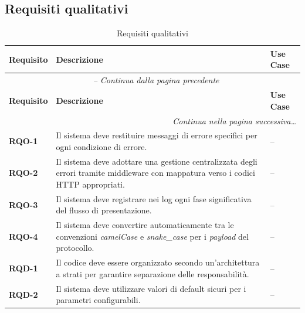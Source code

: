 \subsection{Requisiti qualitativi}
\begin{longtable}{p{1.8cm} p{8.4cm} p{2.2cm}}
\caption{Requisiti qualitativi} \label{tab:requisiti_qualitativi} \\
\toprule
\textbf{Requisito} & \textbf{Descrizione} & \textbf{Use Case} \\
\midrule
\endfirsthead

\multicolumn{3}{c}{\textit{\tablename\ \thetable{} -- Continua dalla pagina precedente}} \\
\midrule
\textbf{Requisito} & \textbf{Descrizione} & \textbf{Use Case} \\
\midrule
\endhead

\midrule
\multicolumn{3}{r}{\textit{Continua nella pagina successiva\dots}} \\
\endfoot

\bottomrule
\endlastfoot

\textbf{RQO-1} & Il sistema deve restituire messaggi di errore specifici per ogni condizione di errore. & -- \\
\hline
\textbf{RQO-2} & Il sistema deve adottare una gestione centralizzata degli errori tramite middleware con mappatura verso i codici HTTP appropriati. & -- \\
\hline
\textbf{RQO-3} & Il sistema deve registrare nei log ogni fase significativa del flusso di presentazione. & -- \\
\hline
\textbf{RQO-4} & Il sistema deve convertire automaticamente tra le convenzioni \textit{camelCase} e \textit{snake\_case} per i \textit{payload} del protocollo. & -- \\
\hline
\textbf{RQD-1} & Il codice deve essere organizzato secondo un'architettura a strati per garantire separazione delle responsabilità. & -- \\
\hline
\textbf{RQD-2} & Il sistema deve utilizzare valori di default sicuri per i parametri configurabili. & -- \\
\end{longtable}

